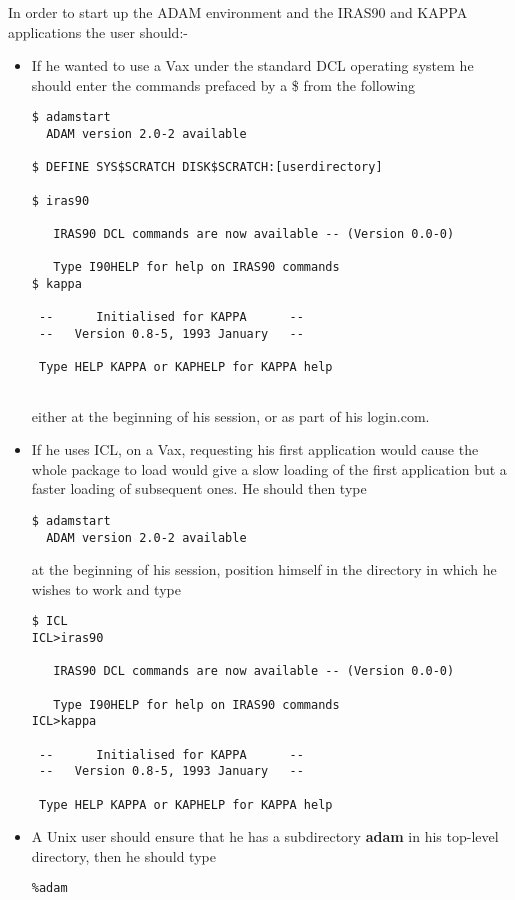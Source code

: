 \documentclass[twoside,11pt]{article}
\begin{document}
In order to start up the ADAM environment and the IRAS90 and KAPPA applications
the user should:-
\begin{itemize}
\item If he wanted to use a Vax under the standard DCL operating system  he 
should enter the commands prefaced by a \$ from the following
\begin{small}
\begin{verbatim}
$ adamstart
  ADAM version 2.0-2 available

$ DEFINE SYS$SCRATCH DISK$SCRATCH:[userdirectory]

$ iras90
 
   IRAS90 DCL commands are now available -- (Version 0.0-0)
 
   Type I90HELP for help on IRAS90 commands
$ kappa
 
 --      Initialised for KAPPA      -- 
 --   Version 0.8-5, 1993 January   -- 
 
 Type HELP KAPPA or KAPHELP for KAPPA help   
 
\end{verbatim}
\end{small}
either at the beginning of his session, or as part of his login.com.
\item If he uses ICL, on a Vax, requesting his first application would cause the
whole package to load would give a slow loading of the first application but a
faster loading of subsequent ones. He should then type
\begin{small}
\begin{verbatim}
$ adamstart
  ADAM version 2.0-2 available
\end{verbatim}
\end{small}
at the beginning of his session, position himself in the directory in which he 
wishes to work and type
\begin{small}
\begin{verbatim}
$ ICL
ICL>iras90
 
   IRAS90 DCL commands are now available -- (Version 0.0-0)
 
   Type I90HELP for help on IRAS90 commands
ICL>kappa
 
 --      Initialised for KAPPA      -- 
 --   Version 0.8-5, 1993 January   -- 
 
 Type HELP KAPPA or KAPHELP for KAPPA help   
\end{verbatim}
\end{small}
\item A Unix user should ensure that he has a subdirectory {\bf adam} in his
top-level directory, then he should type
\begin{small}
\begin{verbatim}
%adam


\end{verbatim}
\end{small}
\end{itemize}
\end{document}
